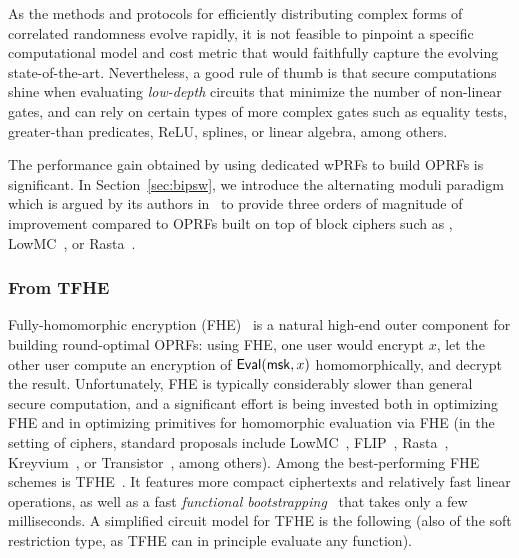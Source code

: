 As the methods and protocols for efficiently distributing complex forms of correlated randomness evolve rapidly, it is not feasible to pinpoint a specific computational model and cost metric that would faithfully capture the evolving state-of-the-art. Nevertheless, a good rule of thumb is that secure computations shine when evaluating \emph{low-depth} circuits that minimize the number of non-linear gates, and can rely on certain types of more complex gates such as equality tests, greater-than predicates, ReLU, splines, or linear algebra, among others.

The performance gain obtained by using dedicated wPRFs to build OPRFs is significant. In Section~\ref{sec:bipsw}, we introduce the alternating moduli paradigm which is argued by its authors in~\cite[Table~2]{TCC:BIPSW18} to provide three orders of magnitude of improvement compared to OPRFs built on top of block ciphers such as \aes{}, {\sf LowMC}~\cite{EC:ARSTZ15}, or {\sf Rasta}~\cite{C:DEGLLL18}.

\subsubsection{From TFHE}

Fully-homomorphic encryption (FHE)~\cite{STOC:Gentry09} is a natural high-end outer component for building round-optimal OPRFs: using FHE, one user would encrypt $x$, let the other user compute an encryption of $\mathsf{Eval}(\mathsf{msk},x)$ homomorphically, and decrypt the result. Unfortunately, FHE is typically considerably slower than general secure computation, and a significant effort is being invested both in optimizing FHE and in optimizing primitives for homomorphic evaluation via FHE (in the setting of ciphers, standard proposals include {\sf LowMC}~\cite{EC:ARSTZ15}, {\sf FLIP}~\cite{EC:MJSC16}, {\sf Rasta}~\cite{C:DEGLLL18}, {\sf Kreyvium}~\cite{FSE:CCFLNP16}, or {\sf Transistor}~\cite{add:Transistor}, among others). Among the best-performing FHE schemes is {\sf TFHE}~\cite{JC:CGGI20}. It features more compact ciphertexts and relatively fast linear operations, as well as a fast \emph{functional bootstrapping}~\cite{EPRINT:MicPol20,EPRINT:Joye21b} that takes only a few milliseconds.
A simplified circuit model for {\sf TFHE} is the following (also of the soft restriction type, as {\sf TFHE} can in principle evaluate any function).

